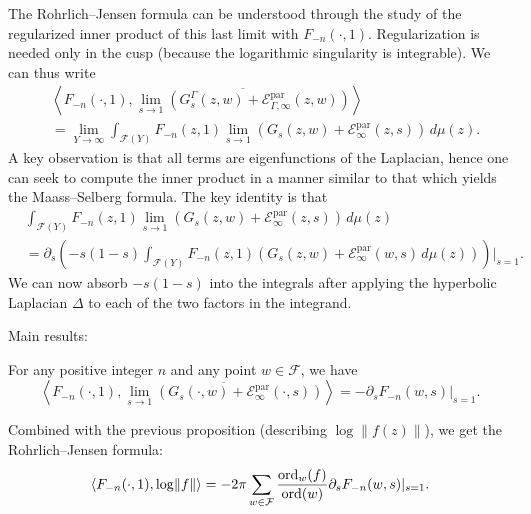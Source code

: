 \documentclass[reqno]{amsart} 
\begin{document}
The Rohrlich--Jensen formula can be understood through the study of the regularized inner product of this last limit with $F_{- n}(\cdot, 1)$.  Regularization is needed only in the cusp (because the logarithmic singularity is integrable).  We can thus write
\begin{align*}
  &\left\langle F_{- n}(\cdot, 1),
    \overline{ \lim_{s \rightarrow 1} \left( G_s^\Gamma(z, w) + \mathcal{E}_{\Gamma, \infty}^{\mathrm{par}}(z, w) \right)}
    \right\rangle \\
  &=
    \lim_{Y \rightarrow \infty}
    \int_{\mathcal{F}(Y)}
    F_{- n}(z, 1) \lim_{s \rightarrow 1} \left( G_s(z, w) + \mathcal{E}_\infty^{\mathrm{par}}(z, s) \right)
    \, d \mu(z).
\end{align*}
A key observation is that all terms are eigenfunctions of the Laplacian, hence one can seek to compute the inner product in a manner similar to that which yields the Maass--Selberg formula.  The key identity is that
\begin{align*}
  &\int_{\mathcal{F}(Y)}
  F_{- n}(z, 1) \lim_{s \rightarrow 1} \left( G_s(z, w) + \mathcal{E}_\infty^{\mathrm{par}}(z, s) \right)
    \, d \mu(z) \\
  &=
    \partial_s \left( - s(1 - s) \int_{\mathcal{F}(Y)}
    F_{- n}(z, 1) \left( G_s(z, w) + \mathcal{E}_\infty^{\mathrm{par}}(w , s) \, d \mu(z) \right)\right)|_{s=1}.
\end{align*}
We can now absorb $- s(1 - s)$ into the integrals after applying the hyperbolic Laplacian $\Delta$ to each of the two factors in the integrand.

Main results:

\begin{theorem}
  For any positive integer $n$ and any point $w \in \mathcal{F}$, we have
  \begin{equation*}
    \left\langle F_{- n}(\cdot, 1), \overline{\lim_{s \rightarrow 1} \left( G_s(\cdot, w) + \mathcal{E}_\infty^{\mathrm{par}}(\cdot, s) \right)} \right\rangle
    = - \partial_s F_{- n}(w, s) |_{s=1}.
  \end{equation*}
\end{theorem}
Combined with the previous proposition (describing $\log \lVert f(z) \rVert$), we get the Rohrlich--Jensen formula:
\begin{equation*}
  \left\langle F_{- n}(\cdot, 1), \log \lVert f \rVert \right\rangle
  = - 2 \pi \sum_{w \in \mathcal{F}}
  \frac{\operatorname{ord}_w(f)}{\operatorname{ord}(w)} \partial_s F_{- n}(w, s)|_{s=1}.
\end{equation*}
\end{document}
